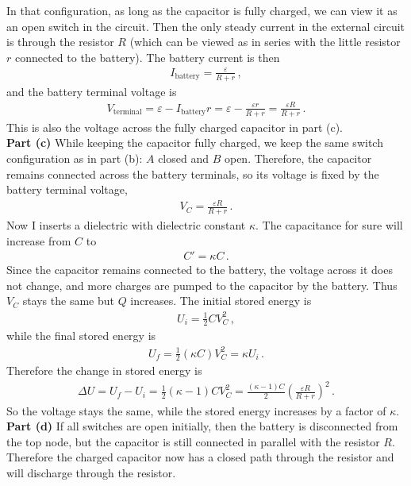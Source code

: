 \documentclass[11pt]{article}
\begin{document}
In that configuration, as long as the capacitor is fully charged, we can view it as an open switch in the circuit. Then the only steady current in the external circuit is through the resistor $R$ (which can be viewed as in series with the little resistor $r$ connected to the battery). The battery current is then
\begin{align*}
I_{\text{battery}} = \frac{\varepsilon}{R+r}\,,
\end{align*}
and the battery terminal voltage is
\begin{align*}
V_{\text{terminal}} = \varepsilon - I_{\text{battery}}r
= \varepsilon - \frac{\varepsilon r}{R+r}
= \frac{\varepsilon R}{R+r}\,.
\end{align*}
This is also the voltage across the fully charged capacitor in part (c).\\

\noindent\textbf{Part (c)} While keeping the capacitor fully charged, we keep the same switch configuration as in part (b): $A$ closed and $B$ open. Therefore, the capacitor remains connected across the battery terminals, so its voltage is fixed by the battery terminal voltage,
\begin{align*}
V_C = \frac{\varepsilon R}{R+r}\,.
\end{align*}
Now I inserts a dielectric with dielectric constant $\kappa$. The capacitance for sure will increase from $C$ to
\begin{align*}
C' = \kappa C\,.
\end{align*}
Since the capacitor remains connected to the battery, the voltage across it does not change, and more charges are pumped to the capacitor by the battery. Thus $V_C$ stays the same but $Q$ increases. The initial stored energy is
\begin{align*}
U_i = \frac{1}{2}CV_C^2\,,
\end{align*}
while the final stored energy is
\begin{align*}
U_f = \frac{1}{2}(\kappa C)V_C^2 = \kappa U_i\,.
\end{align*}
Therefore the change in stored energy is
\begin{align*}
\Delta U = U_f-U_i
= \frac{1}{2}(\kappa-1)CV_C^2
= \frac{(\kappa-1)C}{2}\left(\frac{\varepsilon R}{R+r}\right)^2\,.
\end{align*}
So the voltage stays the same, while the stored energy increases by a factor of $\kappa$.\\

\noindent\textbf{Part (d)} If all switches are open initially, then the battery is disconnected from the top node, but the capacitor is still connected in parallel with the resistor $R$. Therefore the charged capacitor now has a closed path through the resistor and will discharge through the resistor.\\
\end{document}
